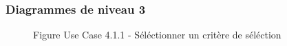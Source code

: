 \documentclass[a4paper, 11pt]{article}
\begin{document}
	\subsubsection{ Diagrammes de niveau 3}
	\begin{figure}[h]
        \caption{Figure Use Case 4.1.1 - Séléctionner un critère de séléction}
        \label{fig-diag-use-case-4-1-1}
        \end{figure}
	\clearpage
\end{document}
